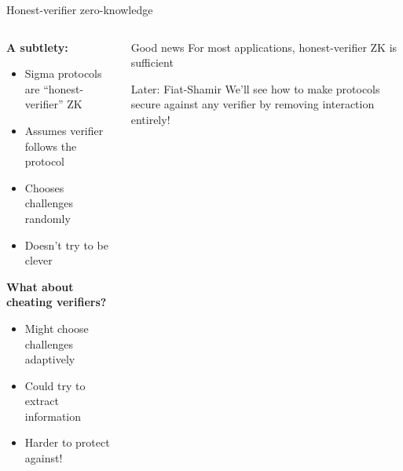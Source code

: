 \documentclass[aspectratio=169, lualatex, handout]{beamer}
\begin{document}
\begin{frame}{Honest-verifier zero-knowledge}
	\begin{columns}[c]
		\begin{column}{0.5\textwidth}
			\textbf{A subtlety:}
			\begin{itemize}
				\item Sigma protocols are ``honest-verifier'' ZK
				\item Assumes verifier follows the protocol
				\item Chooses challenges randomly
				\item Doesn't try to be clever
			\end{itemize}
			\vspace{0.5em}
			\textbf{What about cheating verifiers?}
			\begin{itemize}
				\item Might choose challenges adaptively
				\item Could try to extract information
				\item Harder to protect against!
			\end{itemize}
		\end{column}
		\begin{column}{0.5\textwidth}
			\begin{exampleblock}{Good news}
				For most applications, honest-verifier ZK is sufficient
			\end{exampleblock}
			\vspace{0.5em}
			\begin{alertblock}{Later: Fiat-Shamir}
				We'll see how to make protocols secure against any verifier by removing interaction entirely!
			\end{alertblock}
		\end{column}
	\end{columns}
\end{frame}
\end{document}
